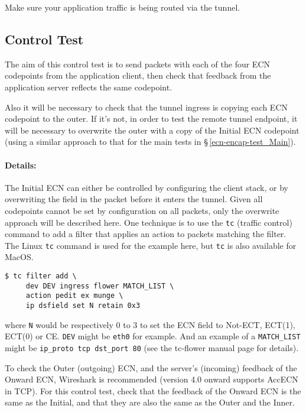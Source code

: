 Make sure your application traffic is being routed via the tunnel.

\subsection{Control Test}\label{ecn-encap-test_Control}

The aim of this control test is to send packets with each of the four ECN codepoints from the application client, then check that feedback from the application server reflects the same codepoint. 

Also it will be necessary to check that the tunnel ingress is copying each ECN codepoint to the outer. If it's not, in order to test the remote tunnel endpoint, it will be necessary to overwrite the outer with a copy of the Initial ECN codepoint (using a similar approach to that for the main tests in \S\,\ref{ecn-encap-test_Main}). 

\paragraph{Details:} The Initial ECN can either be controlled by configuring the client stack, or by overwriting the field in the packet before it enters the tunnel. Given all codepoints cannot be set by configuration on all packets, only the overwrite approach will be described here. One technique is to use the \texttt{tc} (traffic control) command to add a filter that applies an action to packets matching the filter. The Linux \texttt{tc} command is used for the example here, but  \texttt{tc} is also available for MacOS.

\begin{verbatim}
$ tc filter add \
     dev DEV ingress flower MATCH_LIST \
     action pedit ex munge \
     ip dsfield set N retain 0x3
\end{verbatim}
where \texttt{N} would be respectively 0 to 3 to set the ECN field to Not-ECT, ECT(1), ECT(0) or CE. \texttt{DEV} might be \texttt{eth0} for example. And an example of a \texttt{MATCH\_LIST} might be \texttt{ip\_proto tcp dst\_port 80} (see the tc-flower manual page for details).

To check the Outer (outgoing) ECN, and the server's (incoming) feedback of the Onward ECN, Wireshark is recommended (version 4.0 onward supports AccECN in TCP). For this control test, check that the feedback of the Onward ECN is the same as the Initial, and that they are also the same as the Outer and the Inner.

